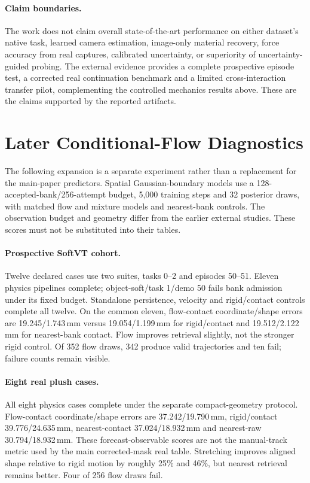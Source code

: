 \documentclass[10pt,twocolumn,letterpaper]{article}
\begin{document}
\paragraph{Claim boundaries.}
The work does not claim overall state-of-the-art performance on either dataset's native task, learned camera estimation, image-only material recovery, force accuracy from real captures, calibrated uncertainty, or superiority of uncertainty-guided probing. The external evidence provides a complete prospective episode test, a corrected real continuation benchmark and a limited cross-interaction transfer pilot, complementing the controlled mechanics results above. These are the claims supported by the reported artifacts.

\section{Later Conditional-Flow Diagnostics}
The following expansion is a separate experiment rather than a replacement for the main-paper predictors. Spatial Gaussian-boundary models use a 128-accepted-bank/256-attempt budget, 5,000 training steps and 32 posterior draws, with matched flow and mixture models and nearest-bank controls. The observation budget and geometry differ from the earlier external studies. These scores must not be substituted into their tables.

\paragraph{Prospective SoftVT cohort.}
Twelve declared cases use two suites, tasks 0--2 and episodes 50--51. Eleven physics pipelines complete; object-soft/task 1/demo 50 fails bank admission under its fixed budget. Standalone persistence, velocity and rigid/contact controls complete all twelve. On the common eleven, flow-contact coordinate/shape errors are 19.245/1.743\,mm versus 19.054/1.199\,mm for rigid/contact and 19.512/2.122\,mm for nearest-bank contact. Flow improves retrieval slightly, not the stronger rigid control. Of 352 flow draws, 342 produce valid trajectories and ten fail; failure counts remain visible.

\paragraph{Eight real plush cases.}
All eight physics cases complete under the separate compact-geometry protocol. Flow-contact coordinate/shape errors are 37.242/19.790\,mm, rigid/contact 39.776/24.635\,mm, nearest-contact 37.024/18.932\,mm and nearest-raw 30.794/18.932\,mm. These forecast-observable scores are not the manual-track metric used by the main corrected-mask real table. Stretching improves aligned shape relative to rigid motion by roughly 25\% and 46\%, but nearest retrieval remains better. Four of 256 flow draws fail.
\end{document}
